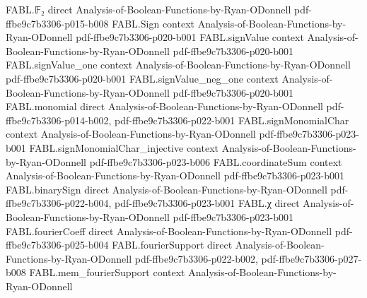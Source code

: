 \begin{theorem}
\label{FABL.BooleanCircuit.toWidthThreeCNF_complete}
\leanok
{}
\proofstep
  {FABL.𝔽₂}
  {direct}
  {Analysis-of-Boolean-Functions-by-Ryan-ODonnell}
  {pdf-ffbe9c7b3306-p015-b008}
\proofstep
  {FABL.Sign}
  {context}
  {Analysis-of-Boolean-Functions-by-Ryan-ODonnell}
  {pdf-ffbe9c7b3306-p020-b001}
\proofstep
  {FABL.signValue}
  {context}
  {Analysis-of-Boolean-Functions-by-Ryan-ODonnell}
  {pdf-ffbe9c7b3306-p020-b001}
\proofstep
  {FABL.signValue_one}
  {context}
  {Analysis-of-Boolean-Functions-by-Ryan-ODonnell}
  {pdf-ffbe9c7b3306-p020-b001}
\proofstep
  {FABL.signValue_neg_one}
  {context}
  {Analysis-of-Boolean-Functions-by-Ryan-ODonnell}
  {pdf-ffbe9c7b3306-p020-b001}
\proofstep
  {FABL.monomial}
  {direct}
  {Analysis-of-Boolean-Functions-by-Ryan-ODonnell}
  {pdf-ffbe9c7b3306-p014-b002,
    pdf-ffbe9c7b3306-p022-b001}
\proofstep
  {FABL.signMonomialChar}
  {context}
  {Analysis-of-Boolean-Functions-by-Ryan-ODonnell}
  {pdf-ffbe9c7b3306-p023-b001}
\proofstep
  {FABL.signMonomialChar_injective}
  {context}
  {Analysis-of-Boolean-Functions-by-Ryan-ODonnell}
  {pdf-ffbe9c7b3306-p023-b006}
\proofstep
  {FABL.coordinateSum}
  {context}
  {Analysis-of-Boolean-Functions-by-Ryan-ODonnell}
  {pdf-ffbe9c7b3306-p023-b001}
\proofstep
  {FABL.binarySign}
  {direct}
  {Analysis-of-Boolean-Functions-by-Ryan-ODonnell}
  {pdf-ffbe9c7b3306-p022-b004,
    pdf-ffbe9c7b3306-p023-b001}
\proofstep
  {FABL.χ}
  {direct}
  {Analysis-of-Boolean-Functions-by-Ryan-ODonnell}
  {pdf-ffbe9c7b3306-p023-b001}
\proofstep
  {FABL.fourierCoeff}
  {direct}
  {Analysis-of-Boolean-Functions-by-Ryan-ODonnell}
  {pdf-ffbe9c7b3306-p025-b004}
\proofstep
  {FABL.fourierSupport}
  {direct}
  {Analysis-of-Boolean-Functions-by-Ryan-ODonnell}
  {pdf-ffbe9c7b3306-p022-b002,
    pdf-ffbe9c7b3306-p027-b008}
\proofstep
  {FABL.mem_fourierSupport}
  {context}
  {Analysis-of-Boolean-Functions-by-Ryan-ODonnell}

\end{theorem}

